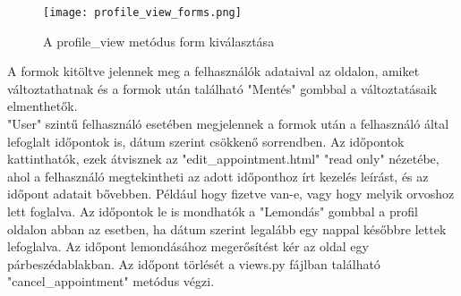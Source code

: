 \begin{figure}[H]
	\caption{A profile\_view metódus form kiválasztása}
	\label{fig:profileviewformkivalasztas}
	\centering
	\texttt{[image: profile\_view\_forms.png]}
\end{figure}

A formok kitöltve jelennek meg a felhasználók adataival az oldalon, amiket változtathatnak és a formok után található "Mentés" gombbal a változtatásaik elmenthetők.\\

"User" szintű felhasználó esetében megjelennek a formok után a felhasználó által lefoglalt időpontok is, dátum szerint csökkenő sorrendben. Az időpontok kattinthatók, ezek átvisznek az "edit\_appointment.html" "read only" nézetébe, ahol a felhasználó megtekintheti az adott időponthoz írt kezelés leírást, és az időpont adatait bővebben. Például hogy fizetve van-e, vagy hogy melyik orvoshoz lett foglalva. Az időpontok le is mondhatók a "Lemondás" gombbal a profil oldalon abban az esetben, ha dátum szerint legalább egy nappal későbbre lettek lefoglalva. Az időpont lemondásához megerősítést kér az oldal egy párbeszédablakban. Az időpont törlését a views.py fájlban található "cancel\_appointment" metódus végzi.
